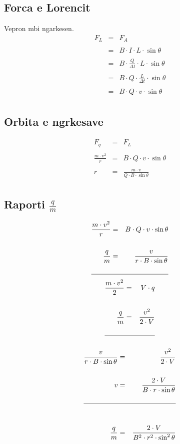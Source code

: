 \documentclass[a4paper, twocolumn]{article}
\begin{document}
\subsection{Forca e Lorencit}
Vepron mbi ngarkesen.
\begin{eqnarray*}
	F_{L} &=& F_{A}\\
	\\
	      &=&B\cdot I\cdot L\cdot \sin{\theta}\\
	      \\
	      &=&B\cdot \frac{Q}{\Delta t} \cdot L \cdot \sin{\theta}\\
	      \\
	      &=&B\cdot Q\cdot \frac{L}{\Delta t}  \cdot \sin{\theta}\\
	      \\
	      &=&B\cdot Q\cdot v\cdot \sin{\theta}\\
\end{eqnarray*}
\subsection{Orbita e ngrkesave}
\begin{eqnarray*}
	F_{q}&=& F_{L} \\
	\\
	\frac{m\cdot v^2}{r}&=&B\cdot Q\cdot v\cdot \sin{\theta}\\
	\\
	r &=& \frac{m\cdot v}{Q\cdot B\cdot \sin{\theta}}\\
\end{eqnarray*}
\subsection{Raporti $\frac{q}{m}$}
\begin{eqnarray*}
	\frac{m\cdot v^2}{r}&=&B\cdot Q\cdot v\cdot \sin{\theta}\\
	\\
	\frac{q}{m}&=&\frac{v}{r\cdot B\cdot \sin{\theta}}\\
	\\
	\hline
\end{eqnarray*}
	\begin{eqnarray*}
	\frac{m\cdot v^2}{2}&=&V\cdot q\\
	\\
	\frac{q}{m}&=&\frac{v^2}{2\cdot V}\\
	\\
	\hline\\
	\end{eqnarray*}
	\begin{eqnarray*}
	\frac{v}{r\cdot B\cdot \sin{\theta}}&=&\frac{v^2}{2\cdot V}\\
	\\
	v&=&\frac{2\cdot V}{B\cdot r\cdot \sin{\theta}}\\
	\\
	\hline\\
	\\
	\frac{q}{m} &=& \frac{2\cdot V}{B^2 \cdot r^2 \cdot \sin^2{\theta}}\\
\end{eqnarray*}
\end{document}
